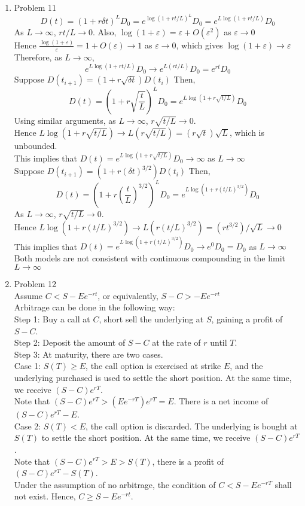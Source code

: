\documentclass[leqno,12pt]{article}
\def\e{\varepsilon}
\def\d{\delta}
\begin{document}
\begin{enumerate}
\pagebreak

\item Problem 11
\[D(t)=(1+r\d t)^LD_0=e^{\log(1+rt/L)^L}D_0=e^{L\log(1+rt/L)}D_0\]
As $L\rightarrow\infty$, $rt/L\rightarrow 0$. Also, $\log(1+\e)=\e+O(\e^2)$ as $\e\rightarrow 0$\\
Hence $\frac{\log(1+\e)}{\e}=1+O(\e)\rightarrow 1$ as $\e\rightarrow 0$, which gives $\log(1+\e)\rightarrow\e$\\
Therefore, as $L\rightarrow\infty$,
\[e^{L\log(1+rt/L)}D_0\rightarrow e^{L(rt/L)}D_0=e^{rt}D_0\]
Suppose $D(t_{i+1})=\left(1+r\sqrt{\d t}\right)D(t_i)$
Then,
\[D(t)=\left(1+r\sqrt{\frac{t}{L}}\right)^LD_0=e^{L \log(1+r\sqrt{t/L})}D_0\]
Using similar arguments, as $L\rightarrow\infty$, $r\sqrt{t/L}\rightarrow 0$.\\
Hence $L\log(1+r\sqrt{t/L})\rightarrow L(r\sqrt{t/L})=(r\sqrt{t})\sqrt{L}$, which is unbounded.\\
This implies that $D(t)=e^{L \log(1+r\sqrt{t/L})}D_0\rightarrow\infty$ as $L\rightarrow\infty$\\
Suppose $D(t_{i+1})=\left(1+r(\d t)^{3/2}\right)D(t_i)$
Then,
\[D(t)=\left(1+r\left(\frac{t}{L}\right)^{3/2}\right)^LD_0=e^{L \log(1+r(t/L)^{3/2})}D_0\]
As $L\rightarrow\infty$, $r\sqrt{t/L}\rightarrow 0$.\\
Hence $L \log(1+r(t/L)^{3/2})\rightarrow L(r(t/L)^{3/2})=(rt^{3/2})/\sqrt{L}\rightarrow 0$\\
This implies that $D(t)=e^{L \log(1+r(t/L)^{3/2})}D_0\rightarrow e^0D_0=D_0$ as $L\rightarrow\infty$\\
Both models are not consistent with continuous compounding in the limit $L\rightarrow\infty$\\

\pagebreak

\item Problem 12\\
Assume $C<S-Ee^{-rt}$, or equivalently, $S-C>-Ee^{-rt}$\\
Arbitrage can be done in the following way:\\
Step 1: Buy a call at $C$, short sell the underlying at $S$, gaining a profit of $S-C$.\\
Step 2: Deposit the amount of $S-C$ at the rate of $r$ until $T$.\\
Step 3: At maturity, there are two cases.\\
Case 1: $S(T)\geq E$, the call option is exercised at strike $E$, and the underlying purchased is used to settle the short position. At the same time, we receive $(S-C)e^{rT}$.\\ 
Note that $(S-C)e^{rT}>(Ee^{-rT})e^{rT}=E$. There is a net income of $(S-C)e^{rT}-E$.\\ 
Case 2: $S(T)<E$, the call option is discarded. The underlying is bought at $S(T)$ to settle the short position. At the same time, we receive $(S-C)e^{rT}$.\\
Note that $(S-C)e^{rT}>E>S(T)$, there is a profit of $(S-C)e^{rT}-S(T)$.\\
Under the assumption of no arbitrage, the condition of $C<S-Ee^{-rT}$ shall not exist.
Hence, $C\geq S-Ee^{-rt}$.


\end{enumerate}
\end{document}
